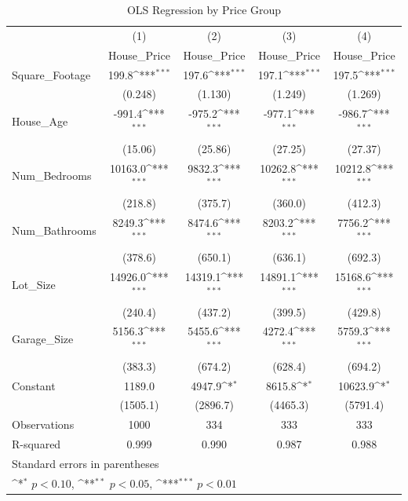 \begin{table}[htbp]\centering
\def\sym#1{\ifmmode^{#1}\else\(^{#1}\)\fi}
\caption{OLS Regression by Price Group}
\begin{tabular}{l*{4}{c}}
\hline\hline
                &\multicolumn{1}{c}{(1)}&\multicolumn{1}{c}{(2)}&\multicolumn{1}{c}{(3)}&\multicolumn{1}{c}{(4)}\\
                &\multicolumn{1}{c}{House\_Price}&\multicolumn{1}{c}{House\_Price}&\multicolumn{1}{c}{House\_Price}&\multicolumn{1}{c}{House\_Price}\\
\hline
Square\_Footage  &    199.8\sym{***}&    197.6\sym{***}&    197.1\sym{***}&    197.5\sym{***}\\
                &  (0.248)         &  (1.130)         &  (1.249)         &  (1.269)         \\
[1em]
House\_Age       &   -991.4\sym{***}&   -975.2\sym{***}&   -977.1\sym{***}&   -986.7\sym{***}\\
                &  (15.06)         &  (25.86)         &  (27.25)         &  (27.37)         \\
[1em]
Num\_Bedrooms    &  10163.0\sym{***}&   9832.3\sym{***}&  10262.8\sym{***}&  10212.8\sym{***}\\
                &  (218.8)         &  (375.7)         &  (360.0)         &  (412.3)         \\
[1em]
Num\_Bathrooms   &   8249.3\sym{***}&   8474.6\sym{***}&   8203.2\sym{***}&   7756.2\sym{***}\\
                &  (378.6)         &  (650.1)         &  (636.1)         &  (692.3)         \\
[1em]
Lot\_Size        &  14926.0\sym{***}&  14319.1\sym{***}&  14891.1\sym{***}&  15168.6\sym{***}\\
                &  (240.4)         &  (437.2)         &  (399.5)         &  (429.8)         \\
[1em]
Garage\_Size     &   5156.3\sym{***}&   5455.6\sym{***}&   4272.4\sym{***}&   5759.3\sym{***}\\
                &  (383.3)         &  (674.2)         &  (628.4)         &  (694.2)         \\
[1em]
Constant        &   1189.0         &   4947.9\sym{*}  &   8615.8\sym{*}  &  10623.9\sym{*}  \\
                & (1505.1)         & (2896.7)         & (4465.3)         & (5791.4)         \\
\hline
Observations    &     1000         &      334         &      333         &      333         \\
R-squared       &    0.999         &    0.990         &    0.987         &    0.988         \\
\hline\hline
\multicolumn{5}{l}{\footnotesize Standard errors in parentheses}\\
\multicolumn{5}{l}{\footnotesize \sym{*} \(p<0.10\), \sym{**} \(p<0.05\), \sym{***} \(p<0.01\)}\\
\end{tabular}
\end{table}
